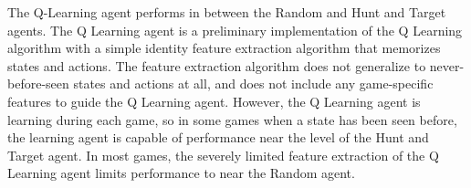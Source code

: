 \documentclass{article}
\begin{document}
\begin{multicols}{2}
The Q-Learning agent performs in between the Random and Hunt and Target agents.  The Q Learning agent is a preliminary implementation of the Q Learning algorithm with a simple identity feature extraction algorithm that memorizes states and actions.  The feature extraction algorithm does not generalize to never-before-seen states and actions at all, and does not include any game-specific features to guide the Q Learning agent.  However, the Q Learning agent is learning during each game, so in some games when a state has been seen before, the learning agent is capable of performance near the level of the Hunt and Target agent.  In most games, the severely limited feature extraction of the Q Learning agent limits performance to near the Random agent.

\end{multicols}
\end{document}
